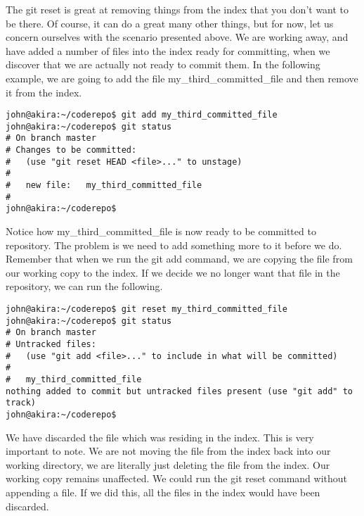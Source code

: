 The git reset is great at removing things from the index that you don't want to be there.  Of course, it can do a great many other things, but for now, let us concern ourselves with the scenario presented above.  We are working away, and have added a number of files into the index ready for committing, when we discover that we are actually not ready to commit them.  In the following example, we are going to add the file my\_third\_committed\_file and then remove it from the index.

\begin{verbatim} 
john@akira:~/coderepo$ git add my_third_committed_file
john@akira:~/coderepo$ git status
# On branch master
# Changes to be committed:
#   (use "git reset HEAD <file>..." to unstage)
#
#	new file:   my_third_committed_file
#
john@akira:~/coderepo$ 
\end{verbatim} 

Notice how my\_third\_committed\_file is now ready to be committed to repository.  The problem is we need to add something more to it before we do.  Remember that when we run the git add command, we are copying the file from our working copy to the index.  If we decide we no longer want that file in the repository, we can run the following.  

\begin{verbatim} 
john@akira:~/coderepo$ git reset my_third_committed_file
john@akira:~/coderepo$ git status
# On branch master
# Untracked files:
#   (use "git add <file>..." to include in what will be committed)
#
#	my_third_committed_file
nothing added to commit but untracked files present (use "git add" to track)
john@akira:~/coderepo$ 
\end{verbatim} 

We have discarded the file which was residing in the index.  This is very important to note.  We are not moving the file from the index back into our working directory, we are literally just deleting the file from the index.  Our working copy remains unaffected.  We could run the git reset command without appending a file.  If we did this, all the files in the index would have been discarded.  


